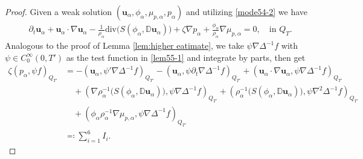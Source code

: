 \documentclass[reqno,a4paper,11pt]{amsart}
\theoremstyle{plain}
\numberwithin{equation}{section}
\newcommand{\bu}{\mathbf{u}}
\begin{document}
							\begin{proof}
								Given a  weak solution $ (\bu_{\alpha},\phi_{\alpha},\mu_{p,\alpha},p_{\alpha})$ and utilizing \eqref{mode54-2} we have
								\begin{align}
									\label{lem55-1}
									& \partial_t  \mathbf{u}_{\alpha} +   \mathbf{u}_{\alpha}\cdot\nabla
									\mathbf{u}_{\alpha}-  \frac{1}{\rho_{\alpha}}\mathrm{div}\big(S(\phi_{\alpha},\mathbb{ D}\mathbf{u}_{\alpha})\big)
									+\zeta\nabla p_{\alpha}+\frac{\phi_{\alpha}}{\rho_{\alpha}} \nabla \mu_{p,\alpha}=0, \quad\text{in $Q_{T}$}.
								\end{align}
								Analogous to the proof of Lemma \ref{lem:higher eatimate}, we  take $\psi\nabla\Delta^{-1}f$ with $\psi\in C_{0}^{\infty}(0,T')$ as the test function in \eqref{lem55-1} and integrate by parts, then  get
							\begin{align}
								\label{lem55-3}
								\nonumber\zeta (p_{\alpha},\psi f)_{Q_{T'}}& =-(\mathbf{u}_{\alpha},\psi'\nabla\Delta^{-1}f)_{Q_{T'}}-(  \mathbf{u}_{\alpha},\psi\partial_t\nabla\Delta^{-1}f)_{Q_{T'}}+   (\mathbf{u}_{\alpha}\cdot\nabla
								\mathbf{u}_{\alpha},\psi\nabla\Delta^{-1}f)_{Q_{T'}}
								\\&\nonumber\quad+ (\nabla\rho_{\alpha}^{-1}\big(S(\phi_{\alpha},\mathbb{ D}\mathbf{u}_{\alpha})\big),\psi\nabla\Delta^{-1}f)_{Q_{T'}}+  (\rho_{\alpha}^{-1}\big(S(\phi_{\alpha},\mathbb{ D}\mathbf{u}_{\alpha})\big),\psi\nabla^{2}\Delta^{-1}f)_{Q_{T'}}
								\\&\nonumber\quad+(\phi_{\alpha}\rho_{\alpha}^{-1} \nabla \mu_{p,\alpha},\psi\nabla\Delta^{-1}f)_{Q_{T'}}
								\\&\eqqcolon \sum_{i=1}^{6}I_{i}.
							\end{align}

\end{proof}
\end{document}
